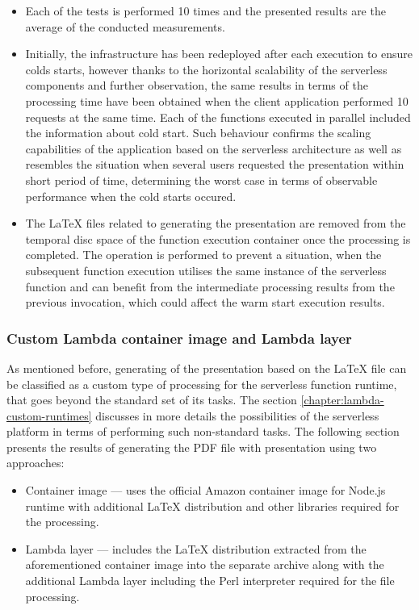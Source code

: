 \begin{itemize}
   \item Each of the tests is performed 10 times and the presented results are the average of the conducted measurements.
   \item Initially, the infrastructure has been redeployed after each execution to ensure colds starts, however thanks to the horizontal scalability of the serverless components and further observation, the same results in terms of the processing time have been obtained when the client application performed 10 requests at the same time. 
   Each of the functions executed in parallel included the information about cold start.
   Such behaviour confirms the scaling capabilities of the application based on the serverless architecture as well as resembles the situation when several users requested the presentation within short period of time, determining the worst case in terms of observable performance when the cold starts occured.
   \item The LaTeX files related to generating the presentation are removed from the temporal disc space of the function execution container once the processing is completed.
   The operation is performed to prevent a situation, when the subsequent function execution utilises the same instance of the serverless function and can benefit from the intermediate processing results from the previous invocation, which could affect the warm start execution results.
\end{itemize}

\subsubsection{Custom Lambda container image and Lambda layer}

As mentioned before, generating of the presentation based on the LaTeX file can be classified as a custom type of processing for the serverless function runtime, that goes beyond the standard set of its tasks. The section \ref{chapter:lambda-custom-runtimes} discusses in more details the possibilities of the serverless platform in terms of performing such non-standard tasks. The following section presents the results of generating the PDF file with presentation using two approaches:

\begin{itemize}
   \item Container image --- uses the official Amazon container image for Node.js runtime with additional LaTeX distribution and other libraries required for the processing.
   \item Lambda layer --- includes the LaTeX distribution extracted from the aforementioned container image into the separate archive along with the additional Lambda layer including the Perl interpreter required for the file processing.
\end{itemize}

